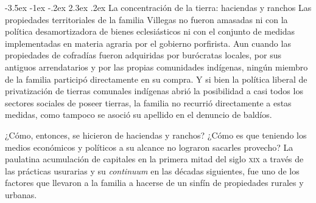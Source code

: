 \documentclass[14pt,twoside,final]{extbook} %
\makeatletter
\renewcommand\section{\@startsection {section}{1}{\z@}%
                                     {-3.5ex \@plus -1ex \@minus -.2ex}%
                                     {2.3ex \@plus .2ex}%
                                     {\normalfont\large\bfseries\sc}}
\makeatother
\begin{document}
\section{La concentración de la tierra: haciendas y ranchos}\label{sec:concentracion-haciendas-y-ranchos}
Las propiedades territoriales de la familia Villegas no fueron amasadas ni con la política desamortizadora de bienes eclesiásticos ni con el conjunto de medidas implementadas en materia agraria por el gobierno porfirista. Aun cuando las propiedades de cofradías fueron adquiridas por burócratas locales, por sus antiguos arrendatarios y por las propias comunidades indígenas, ningún miembro de la familia participó directamente en su compra. Y si bien la política liberal de privatización de tierras comunales indígenas abrió la posibilidad a casi todos los sectores sociales de poseer tierras, la familia no recurrió directamente a estas medidas, como tampoco se asoció su apellido en el denuncio de baldíos.

¿Cómo, entonces, se hicieron de haciendas y ranchos? ¿Cómo es que teniendo los medios económicos y políticos a su alcance no lograron sacarles provecho? La paulatina acumulación de capitales en la primera mitad del siglo \textsc{xix} a través de las prácticas usurarias y su \emph{continuum} en las décadas siguientes, fue uno de los factores que llevaron a la familia a hacerse de un sinfín de propiedades rurales y urbanas.
\end{document}
